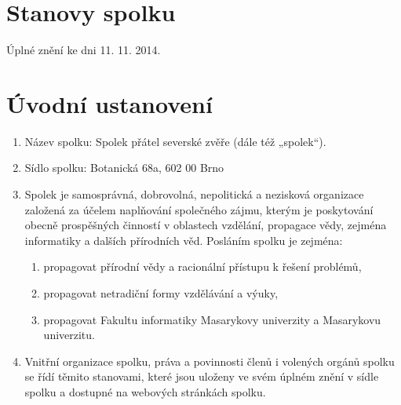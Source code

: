 \documentclass[11pt]{article}
\begin{document}
\section*{Stanovy spolku}

Úplné znění ke dni 11. 11. 2014.

\section{Úvodní ustanovení}
\begin{enumerate}
\item Název spolku: Spolek přátel severské zvěře (dále též „spolek“).
\item Sídlo spolku: Botanická 68a, 602 00 Brno
\item Spolek je samosprávná, dobrovolná, nepolitická a nezisková organizace založená za účelem naplňování společného zájmu, kterým je poskytování obecně prospěšných činností v oblastech vzdělání, propagace vědy, zejména informatiky a dalších přírodních věd. Posláním spolku je zejména: 
\begin{enumerate}
\item propagovat přírodní vědy a racionální přístupu k řešení problémů,
\item propagovat netradiční formy vzdělávání a výuky,
\item propagovat Fakultu informatiky Masarykovy univerzity a Masarykovu univerzitu.
\end{enumerate}
\item Vnitřní organizace spolku, práva a povinnosti členů i volených orgánů spolku se řídí těmito stanovami, které jsou uloženy ve svém úplném znění v sídle spolku a dostupné na webových stránkách spolku.
\end{enumerate}
\end{document}
